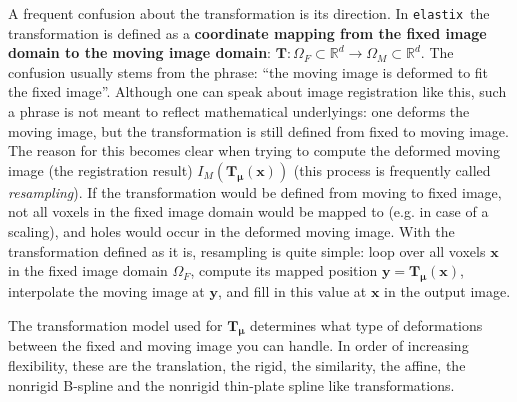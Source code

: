 \documentclass[]{report}
\newcommand{\elastix}{\texttt{elastix}}
\newcommand{\vx}{\bm{x}}
\newcommand{\vmu}{\bm{\mu}}
\newcommand{\vT}{\bm{T}}
\newcommand{\vTmx}{\bm{T}_{\vmu}(\bm{x})}
\begin{document}
A frequent confusion about the transformation is its direction. In \elastix\
the transformation is defined as a \textbf{coordinate mapping from the fixed
image domain to the moving image domain}: $\vT: \Omega_F \subset \mathbb{R}^d
\rightarrow \Omega_M \subset \mathbb{R}^d$. The confusion usually stems from
the phrase: ``the moving image is deformed to fit the fixed image''. Although
one can speak about image registration like this, such a phrase is not meant to
reflect mathematical underlyings: one deforms the moving image, but the
transformation is still defined from fixed to moving image. The reason for this
becomes clear when trying to compute the deformed moving image (the
registration result) $I_M(\vTmx)$ (this process is frequently called
\emph{resampling}). If the transformation would be defined from moving to fixed
image, not all voxels in the fixed image domain would be mapped to (e.g. in
case of a scaling), and holes would occur in the deformed moving image. With
the transformation defined as it is, resampling is quite simple: loop over all
voxels $\vx$ in the fixed image domain $\Omega_F$, compute its mapped position
$\bm{y} = \vTmx$, interpolate the moving image at $\bm{y}$, and fill in this
value at $\vx$ in the output image.

The transformation model used for $\vT_{\vmu}$ determines what type of
deformations between the fixed and moving image you can handle. In order of
increasing flexibility, these are the translation, the rigid, the similarity,
the affine, the nonrigid B-spline and the nonrigid thin-plate spline like
transformations.
\end{document}
